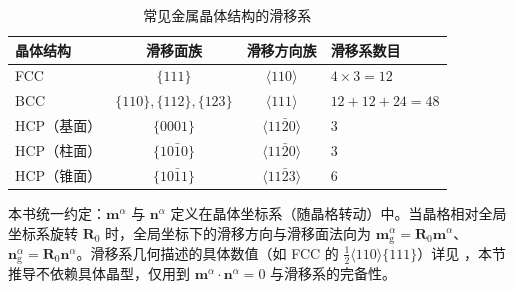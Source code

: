 \begin{table}[htbp]
  \centering
  \small
  \caption{常见金属晶体结构的滑移系 \cite{Roters2010}}
  \label{tab:cp-slip-systems}
  \begin{tabular}{lccl}
    \toprule
    晶体结构 & 滑移面族 & 滑移方向族 & 滑移系数目 \\
    \midrule
    FCC & $\{111\}$ & $\langle110\rangle$ & $4\times3=12$ \\
    BCC & $\{110\},\{112\},\{123\}$ & $\langle111\rangle$ & $12+12+24=48$ \\
    HCP（基面） & $\{0001\}$ & $\langle11\bar{2}0\rangle$ & $3$ \\
    HCP（柱面） & $\{10\bar{1}0\}$ & $\langle11\bar{2}0\rangle$ & $3$ \\
    HCP（锥面） & $\{10\bar{1}1\}$ & $\langle11\bar{2}3\rangle$ & $6$ \\
    \bottomrule
  \end{tabular}
\end{table}

\begin{remark}
  本书统一约定：$\mathbf{m}^{\alpha}$ 与 $\mathbf{n}^{\alpha}$ 定义在晶体坐标系（随晶格转动）中。当晶格相对全局坐标系旋转 $\mathbf{R}_{0}$ 时，全局坐标下的滑移方向与滑移面法向为 $\mathbf{m}^{\alpha}_{\mathrm{g}}=\mathbf{R}_{0}\mathbf{m}^{\alpha}$、$\mathbf{n}^{\alpha}_{\mathrm{g}}=\mathbf{R}_{0}\mathbf{n}^{\alpha}$。滑移系几何描述的具体数值（如 FCC 的 $\tfrac{1}{2}\langle110\rangle\{111\}$）详见 \cite{Roters2010}，本节推导不依赖具体晶型，仅用到 $\mathbf{m}^{\alpha}\cdot\mathbf{n}^{\alpha}=0$ 与滑移系的完备性。
\end{remark}

